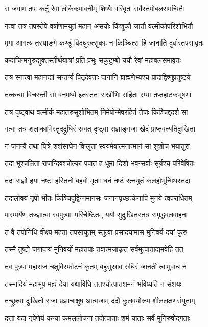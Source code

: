\twolineshloka
{स जगाम तपः कर्तुं रेवां लोकैकपावनीम्}
{शिष्यैः परिवृतः सर्वैस्तपोबलसमन्वितैः}%

\twolineshloka
{गत्वा तत्र तपस्तेपे वर्षाणामयुतं महान्}
{अंसयोः किंशुकौ जातौ वल्मीकोपरिशोभितौ}%

\twolineshloka
{मृगा आगत्य तस्याङ्गे कण्डूं विदधुरुत्सुकाः}
{न किञ्चित्स हि जानाति दुर्वारतपसावृतः}%

\twolineshloka
{कदाचिन्मनुरुद्युक्तस्तीर्थयात्रां प्रति प्रभुः}
{सकुटुम्बो ययौ रेवां महाबलसमावृतः}%

\twolineshloka
{तत्र स्नात्वा महानद्यां सन्तर्प्य पितृदेवताः}
{दानानि ब्राह्मणेभ्यश्च प्रादाद्विष्णुप्रतुष्टये}%

\twolineshloka
{तत्कन्या विचरन्ती सा वनमध्ये इतस्ततः}
{सखीभिः सहिता रम्या तप्तहाटकभूषणा}%

\twolineshloka
{तत्र दृष्ट्वाथ वल्मीकं महातरुसुशोभितम्}
{निमेषोन्मेषरहितं तेजः किञ्चिद्ददर्श सा}%

\twolineshloka
{गत्वा तत्र शलाकाभिरतुदद्रुधिरं स्रवत्}
{दृष्ट्वा राज्ञाङ्गजा खेदं प्राप्तवत्यतिदुःखिता}%

\twolineshloka
{न जनन्यै तथा पित्रे शशंसाघेन विप्लुता}
{स्वयमेवात्मनात्मानं सा शुशोच भयातुरा}%

\twolineshloka
{तदा भूश्चलिता राजन्दिवश्चोल्का पपात ह}
{धूम्रा दिशो भवन्सर्वाः सूर्यश्च परिवेषितः}%

\twolineshloka
{तदा राज्ञो हया नष्टा हस्तिनो बहवो मृताः}
{धनं नष्टं रत्नयुतं कलहोभून्मिथस्तदा}%

\twolineshloka
{तदालोक्य नृपो भीतः किञ्चिदुद्विग्नमानसः}
{जनानपृच्छत्केनापि मुनये त्वपराधितम्}%

\twolineshloka
{पारम्पर्येण तज्ज्ञात्वा स्वपुत्र्याः परिचेष्टितम्}
{ययौ सुदुःखितस्तत्र समृद्धबलवाहनः}%

\twolineshloka
{तं वै तपोनिधिं वीक्ष्य महता तपसायुतम्}
{स्तुत्वा प्रसादयामास मुनिवर्य दयां कुरु}%

\twolineshloka
{तस्मै तुष्टो जगादायं मुनिवर्यो महातपाः}
{तवात्मजाकृतं सर्वमुत्पाताद्यमवेहि तत्}%

\twolineshloka
{तव पुत्र्या महाराज चक्षुर्विस्फोटनं कृतम्}
{बहुसुस्राव रुधिरं जानती त्वामुवाच न}%

\twolineshloka
{तस्मादियं महाभूप मह्यं देया यथाविधि}
{ततश्चोत्पातशमनं भविष्यति न संशयः}%

\twolineshloka
{तच्छ्रुत्वा दुःखितो राजा प्रज्ञाचाक्षुष आत्मजाम्}
{ददौ कुलवयोरूप शीललक्षणसंयुताम्}%

\twolineshloka
{दत्ता यदा नृपेणेयं कन्या कमललोचना}
{तदोत्पाताः शमं याताः सर्वे मुनिरुषोद्गताः}%

